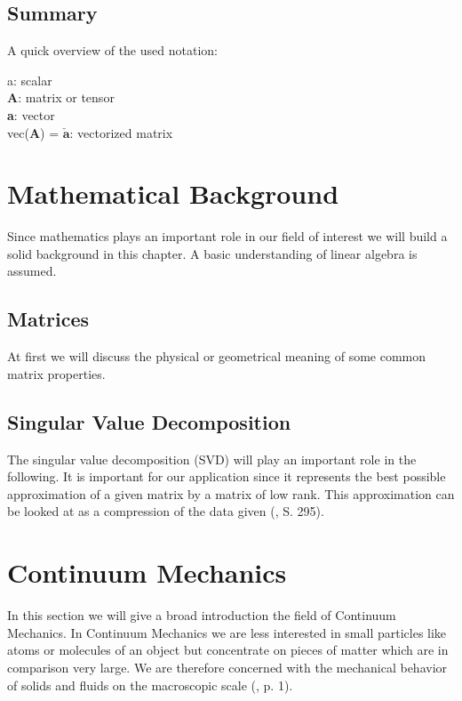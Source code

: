 \subsection{Summary}
A quick overview of the used notation:

\begin{addmargin}[2cm]{2cm}
a: scalar \\
\textbf{A}: matrix or tensor \\
\textbf{a}: vector \\
vec(\textbf{A}) = $\boldsymbol{\check{a}}$: vectorized matrix
\end{addmargin}

\section{Mathematical Background}

Since mathematics plays an important role in our field of interest we will build a solid background in this chapter. A basic understanding of linear algebra is assumed.

\subsection{Matrices}
At first we will discuss the physical or geometrical meaning of some common matrix properties.


\subsection{Singular Value Decomposition}

The singular value decomposition (SVD) will play an important role in the following. It is important for our application since it represents the best possible approximation of a given matrix by a matrix of low rank. This approximation can be looked at as a compression of the data given (\cite{LiesenMehrmann2015}, S. 295).

\section{Continuum Mechanics}
In this section we will give a broad introduction the field of Continuum Mechanics.
In Continuum Mechanics we are less interested in small particles like atoms or molecules of an object but concentrate on pieces of matter which are in comparison very large. We are therefore concerned with the mechanical behavior of solids and fluids on the macroscopic scale (\cite{Spencer1980}, p. 1).


